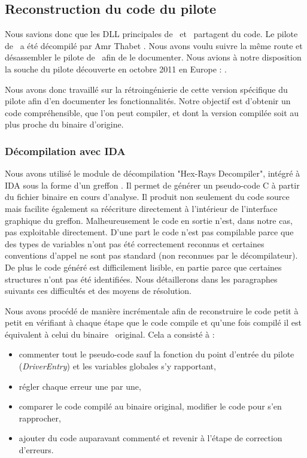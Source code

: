 \subsection{Reconstruction du code du pilote}
Nous savions donc que les DLL principales de \duqu\ et \stux\ partagent du code.
Le pilote de \stux\ a été décompilé par Amr Thabet \cite{ThabetDriver}.
Nous avons voulu suivre la même route et désassembler le pilote de \duqu\ afin de le documenter.
Nous avions à notre disposition la souche du pilote découverte en octobre 2011 en Europe : \driver.

Nous avons donc travaillé sur la rétroingénierie de cette version spécifique du pilote afin d’en documenter les fonctionnalités. 
Notre objectif est d’obtenir un code compréhensible, que l'on peut compiler, et dont la version compilée soit au plus proche du binaire d'origine.

\subsubsection{Décompilation avec IDA}
Nous avons utilisé le module de décompilation "Hex-Rays Decompiler", intégré à IDA sous la forme d’un greffon \cite{IDADecompiler}.
Il permet de générer un pseudo-code C à partir du fichier binaire en cours d’analyse.
Il produit non seulement du code source mais facilite également sa réécriture directement à l’intérieur de l’interface graphique du greffon. 
Malheureusement le code en sortie n’est, dans notre cas, pas exploitable directement. 
D’une part le code n’est pas compilable parce que des types de variables n’ont pas été correctement reconnus et certaines conventions d’appel ne sont pas standard (non reconnues par le décompilateur). 
De plus le code généré est difficilement lisible, en partie parce que certaines structures n’ont pas été identifiées.
Nous détaillerons dans les paragraphes suivants ces difficultés et des moyens de résolution.

Nous avons procédé de manière incrémentale afin de reconstruire le code petit à petit en vérifiant à chaque étape que le code compile et qu'une fois compilé il est équivalent à celui du binaire \driver\ original. 
Cela a consisté à :
\begin{itemize}
 \item commenter tout le pseudo-code sauf la fonction du point d'entrée du pilote (\emph{DriverEntry}) et les variables globales s'y rapportant,
 \item régler chaque erreur une par une,
 \item comparer le code compilé au binaire original, modifier le code pour s'en rapprocher,
 \item ajouter du code auparavant commenté et revenir à l'étape de correction d'erreurs.
\end{itemize}

